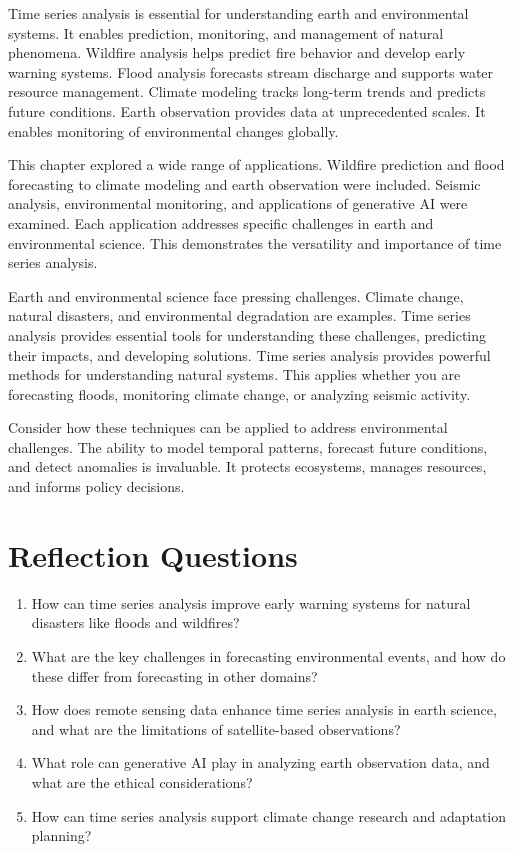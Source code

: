 Time series analysis is essential for understanding earth and environmental systems. It enables prediction, monitoring, and management of natural phenomena. Wildfire analysis helps predict fire behavior and develop early warning systems. Flood analysis forecasts stream discharge and supports water resource management. Climate modeling tracks long-term trends and predicts future conditions. Earth observation provides data at unprecedented scales. It enables monitoring of environmental changes globally.

This chapter explored a wide range of applications. Wildfire prediction and flood forecasting to climate modeling and earth observation were included. Seismic analysis, environmental monitoring, and applications of generative AI were examined. Each application addresses specific challenges in earth and environmental science. This demonstrates the versatility and importance of time series analysis.

Earth and environmental science face pressing challenges. Climate change, natural disasters, and environmental degradation are examples. Time series analysis provides essential tools for understanding these challenges, predicting their impacts, and developing solutions. Time series analysis provides powerful methods for understanding natural systems. This applies whether you are forecasting floods, monitoring climate change, or analyzing seismic activity.

Consider how these techniques can be applied to address environmental challenges. The ability to model temporal patterns, forecast future conditions, and detect anomalies is invaluable. It protects ecosystems, manages resources, and informs policy decisions.

\section*{Reflection Questions}

\begin{enumerate}
\item How can time series analysis improve early warning systems for natural disasters like floods and wildfires?

\item What are the key challenges in forecasting environmental events, and how do these differ from forecasting in other domains?

\item How does remote sensing data enhance time series analysis in earth science, and what are the limitations of satellite-based observations?

\item What role can generative AI play in analyzing earth observation data, and what are the ethical considerations?

\item How can time series analysis support climate change research and adaptation planning?
\end{enumerate}

